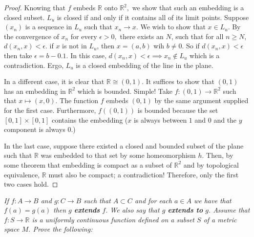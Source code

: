 \documentclass[letter]{article}
\newenvironment{menumerate}{%
  \edef\backupindent{\the\parindent}%
  \enumerate%
  \setlength{\parindent}{\backupindent}%
}{\endenumerate}
\begin{document}
\begin{menumerate}
\begin{proof}
				Knowing that $f$ embeds $\mathbb{R}$ onto $\mathbb{R}^2,$ we show that such an embedding is a closed subset. $L_u$ is closed if and only if it contains all of its limit points. Suppose $(x_n)$ is a sequence in $L_u$ such that $x_n \to x$. We wish to show that $x \in L_u.$ By the convergence of $x_n$ for every $\epsilon > 0,$ there exists an $N$, such that for all $n \geq N$, $d(x_n, x) < \epsilon.$ if $x$ is not in $L_u$, then $x = (a,b)$ wih $b \neq 0.$ So if $d(x_n,x) < \epsilon$ then take $\epsilon = b - 0.1.$ In this case, $d(x_n,x) < \epsilon \implies x_n \notin L_u$ which is a contradiction. Ergo, $L_u$ is a closed embedding of the line in the plane.

				In a different case, it is clear that $\mathbb{R} \cong (0,1).$ It suffices to show that $(0,1)$ has an embedding in $\mathbb{R}^2$ which is bounded. Simple! Take $f: (0,1) \to \mathbb{R}^2$ such that $x\mapsto (x,0).$ The function $f$ embeds $(0,1)$ by the same argument supplied for the first case. Furthermore, $f((0,1))$ is bounded because the set $[0,1]\times[0,1]$ contains the embedding ($x$ is always between $1$ and $0$ and the $y$ component is always $0$.) 

				In the last case, suppose there existed a closed and bounded subset of the plane such that $\mathbb{R}$ was embedded to that set by some homeomorphism $h$. Then, by some theorem that embedding is compact as a subset of $\mathbb{R}^2$ and by topological equivalence, $\mathbb{R}$ must also be compact; a contradiction! Therefore, only the first two cases hold.
			\end{proof}

		\setcounter{enumi}{52}
		\item 





		\item \emph{If $f: A \to B$ and $g: C \to B$ such that $A \subset C$ and for each $a \in A$ we have that $f(a) = g(a)$ then $g$ \textbf{extends} $f$. We also say that $g$ \textbf{extends to} $g$. Assume that $f: S \to \mathbb{R}$ is a uniformly continuous function defined on a subset $S$ of a metric space $M$. Prove the following:}


\end{menumerate}
\end{document}

